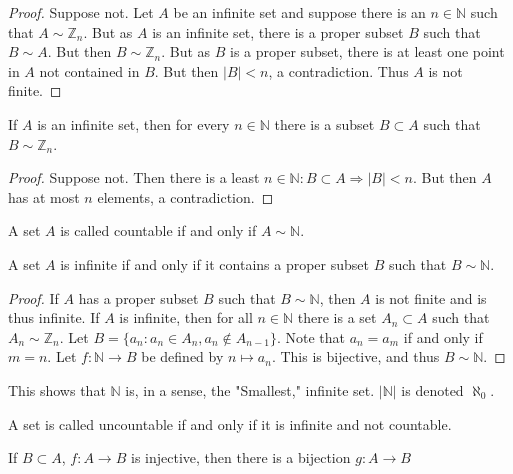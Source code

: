 \documentclass[crop=false,class=book,oneside]{standalone}
\begin{document}
            \begin{proof}
            Suppose not. Let $A$ be an infinite set and suppose there is an $n\in \mathbb{N}$ such that $A\sim \mathbb{Z}_n$. But as $A$ is an infinite set, there is a proper subset $B$ such that $B\sim A$. But then $B\sim \mathbb{Z}_n$. But as $B$ is a proper subset, there is at least one point in $A$ not contained in $B$. But then $|B|<n$, a contradiction. Thus $A$ is not finite.
            \end{proof}
            \begin{corollary}
            If $A$ is an infinite set, then for every $n\in \mathbb{N}$ there is a subset $B\subset A$ such that $B\sim \mathbb{Z}_n$.
            \end{corollary}
            \begin{proof}
            Suppose not. Then there is a least $n\in \mathbb{N}:B\subset A\Rightarrow |B|<n$. But then $A$ has at most $n$ elements, a contradiction.
            \end{proof}
            \begin{definition}
            A set $A$ is called countable if and only if $A\sim \mathbb{N}$.
            \end{definition}
            \begin{theorem}
            A set $A$ is infinite if and only if it contains a proper subset $B$ such that $B\sim \mathbb{N}$.
            \end{theorem}
            \begin{proof}
            If $A$ has a proper subset $B$ such that $B\sim \mathbb{N}$, then $A$ is not finite and is thus infinite. If $A$ is infinite, then for all $n\in \mathbb{N}$ there is a set $A_n\subset A$ such that $A_n \sim \mathbb{Z}_n$. Let $B = \{a_n: a_n \in A_n, a_n \notin A_{n-1}\}$. Note that $a_{n} = a_{m}$ if and only if $m= n$. Let $f:\mathbb{N} \rightarrow B$ be defined by $n\mapsto a_n$. This is bijective, and thus $B\sim \mathbb{N}$.
            \end{proof}
            \begin{remark}
            This shows that $\mathbb{N}$ is, in a sense, the "Smallest," infinite set. $|\mathbb{N}|$ is denoted $\aleph_0$.
            \end{remark}
            \begin{definition}
            A set is called uncountable if and only if it is infinite and not countable.
            \end{definition}
            \begin{lemma}
            If $B\subset A$, $f:A\rightarrow B$ is injective, then there is a bijection $g:A\rightarrow B$
            \end{lemma}
\end{document}
